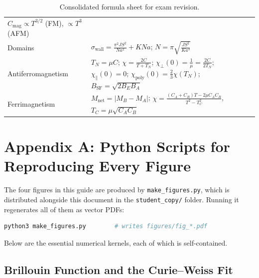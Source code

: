 \documentclass[11pt,a4paper]{article}
\begin{document}
\begin{table}[htbp]
\begin{tabularx}{\textwidth}{L{3.1cm} Y}
$C_{\mathrm{mag}}\propto T^{3/2}$ (FM), $\propto T^3$ (AFM) \\
\addlinespace
Domains &
$\sigma_{\mathrm{wall}} = \frac{\pi^2JS^2}{Na^2} + KNa$; $N = \pi\sqrt{\frac{JS^2}{Ka^3}}$ \\
\addlinespace
Antiferromagnetism &
$T_N = \mu C$; $\chi = \frac{2C}{T+T_N}$;
$\chi_\perp(0) = \frac{1}{\mu} = \frac{2C}{2T_N}$; $\chi_\parallel(0) = 0$;
$\chi_{\mathrm{poly}}(0) = \frac{2}{3}\chi(T_N)$;
$B_{\mathrm{SF}} = \sqrt{2B_EB_A}$ \\
\addlinespace
Ferrimagnetism &
$M_{\mathrm{net}} = |M_B-M_A|$;
$\chi = \frac{(C_A+C_B)T-2\mu C_AC_B}{T^2-T_C^2}$, $T_C = \mu\sqrt{C_AC_B}$ \\
\bottomrule
\end{tabularx}
\caption{Consolidated formula sheet for exam revision.}
\label{tab:formulasheet}
\end{table}

\clearpage

\appendix
\section{Appendix A: Python Scripts for Reproducing Every Figure}
\label{app:scripts}

The four figures in this guide are produced by \texttt{make\_figures.py}, which is distributed alongside this document in the \texttt{student\_copy/} folder. Running it regenerates all of them as vector PDFs:

\begin{lstlisting}[caption={Regenerating every figure (run in the document folder).},language=bash]
python3 make_figures.py        # writes figures/fig_*.pdf
\end{lstlisting}

Below are the essential numerical kernels, each of which is self-contained.

\subsection{Brillouin Function and the Curie--Weiss Fit}
\end{document}
